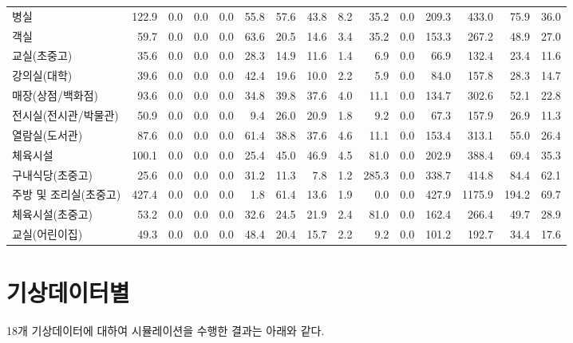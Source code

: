 \begin{defaulttable}
\begin{tabular}{lrrrrrrrrrrrrrr}
병실 & 122.9 & 0.0 & 0.0 & 0.0 & 55.8 & 57.6 & 43.8 & 8.2 & 35.2 & 0.0 & 209.3 & 433.0 & 75.9 & 36.0 \\
객실 & 59.7 & 0.0 & 0.0 & 0.0 & 63.6 & 20.5 & 14.6 & 3.4 & 35.2 & 0.0 & 153.3 & 267.2 & 48.9 & 27.0 \\
교실(초중고) & 35.6 & 0.0 & 0.0 & 0.0 & 28.3 & 14.9 & 11.6 & 1.4 & 6.9 & 0.0 & 66.9 & 132.4 & 23.4 & 11.6 \\
강의실(대학) & 39.6 & 0.0 & 0.0 & 0.0 & 42.4 & 19.6 & 10.0 & 2.2 & 5.9 & 0.0 & 84.0 & 157.8 & 28.3 & 14.7 \\
매장(상점/백화점) & 93.6 & 0.0 & 0.0 & 0.0 & 34.8 & 39.8 & 37.6 & 4.0 & 11.1 & 0.0 & 134.7 & 302.6 & 52.1 & 22.8 \\
전시실(전시관/박물관) & 50.9 & 0.0 & 0.0 & 0.0 & 9.4 & 26.0 & 20.9 & 1.8 & 9.2 & 0.0 & 67.3 & 157.9 & 26.9 & 11.3 \\
열람실(도서관) & 87.6 & 0.0 & 0.0 & 0.0 & 61.4 & 38.8 & 37.6 & 4.6 & 11.1 & 0.0 & 153.4 & 313.1 & 55.0 & 26.4 \\
체육시설 & 100.1 & 0.0 & 0.0 & 0.0 & 25.4 & 45.0 & 46.9 & 4.5 & 81.0 & 0.0 & 202.9 & 388.4 & 69.4 & 35.3 \\
구내식당(초중고) & 25.6 & 0.0 & 0.0 & 0.0 & 31.2 & 11.3 & 7.8 & 1.2 & 285.3 & 0.0 & 338.7 & 414.8 & 84.4 & 62.1 \\
주방 및 조리실(초중고) & 427.4 & 0.0 & 0.0 & 0.0 & 1.8 & 61.4 & 13.6 & 1.9 & 0.0 & 0.0 & 427.9 & 1175.9 & 194.2 & 69.7 \\
체육시설(초중고) & 53.2 & 0.0 & 0.0 & 0.0 & 32.6 & 24.5 & 21.9 & 2.4 & 81.0 & 0.0 & 162.4 & 266.4 & 49.7 & 28.9 \\
교실(어린이집) & 49.3 & 0.0 & 0.0 & 0.0 & 48.4 & 20.4 & 15.7 & 2.2 & 9.2 & 0.0 & 101.2 & 192.7 & 34.4 & 17.6 \\
\bottomrule
\end{tabular}

\end{defaulttable}


\section{기상데이터별}
18개 기상데이터에 대하여 시뮬레이션을 수행한 결과는 아래와 같다. 

